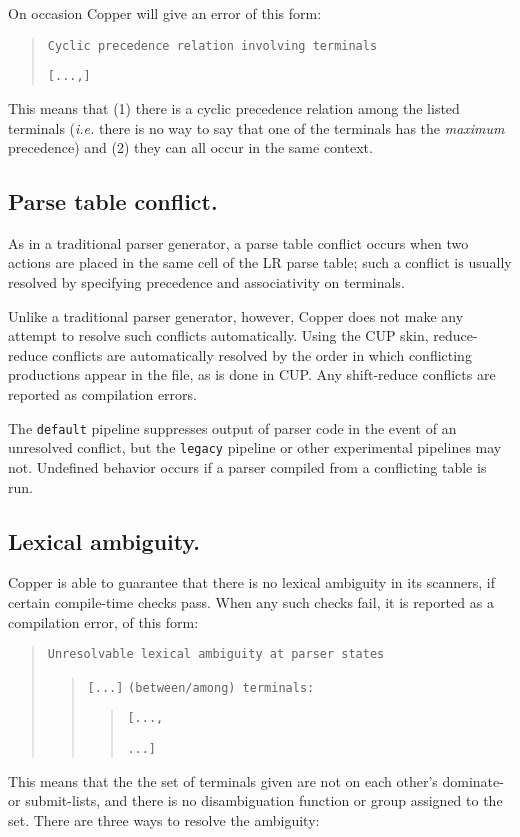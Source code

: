 \documentclass[12pt,english,twoside]{report}
\begin{document}
On occasion Copper will give an error of this form:

\begin{quote}
\texttt{Cyclic precedence relation involving terminals}

\texttt{{[}...,{]}}
\end{quote}
This means that (1) there is a cyclic precedence relation among the
listed terminals (\emph{i.e.} there is no way to say that one of the
terminals has the \emph{maximum} precedence) and (2) they can all
occur in the same context.


\subsection{Parse table conflict.}

As in a traditional parser generator, a parse table conflict occurs
when two actions are placed in the same cell of the LR parse table;
such a conflict is usually resolved by specifying precedence and associativity
on terminals.

Unlike a traditional parser generator, however, Copper does not make
any attempt to resolve such conflicts automatically. Using the CUP
skin, reduce-reduce conflicts are automatically resolved by the order
in which conflicting productions appear in the file, as is done in
CUP. Any shift-reduce conflicts are reported as compilation errors.

The \texttt{default} pipeline suppresses output of parser code in the
event of an unresolved conflict, but the \texttt{legacy} pipeline or
other experimental pipelines may not. Undefined behavior occurs if a
parser compiled from a conflicting table is run.

\subsection{Lexical ambiguity.}

Copper is able to guarantee that there is no lexical ambiguity in
its scanners, if certain compile-time checks pass. When any such checks
fail, it is reported as a compilation error, of this form:

\begin{quote}
\texttt{Unresolvable lexical ambiguity at parser states}
\begin{quote}
\texttt{{[}...]}
\texttt{(between/among) terminals:}
\begin{quote}
\texttt{{[}...,}

\texttt{...]}
\end{quote}
\end{quote}
\end{quote}
This means that the the set of terminals given are not on each other's
dominate- or submit-lists, and there is no disambiguation function
or group assigned to the set. There are three ways to resolve the
ambiguity:
\end{document}
